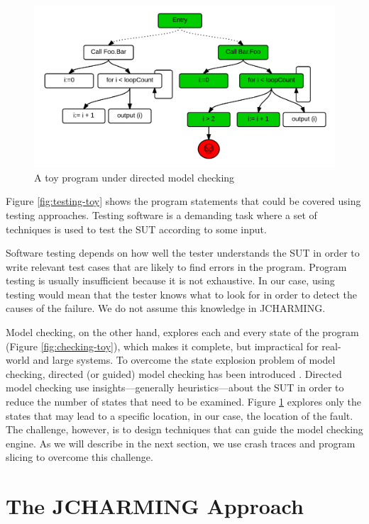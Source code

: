 \documentclass[times]{smrauth}
\begin{document}
\begin{figure}[h!]
  \centering
    \includegraphics{media/dmc.png}
    \caption{A toy program under directed model checking
    \label{fig:dchecking-toy}}
\end{figure}

Figure \ref{fig:testing-toy} shows the program statements that could be covered using testing approaches. Testing software is a demanding task where a set of techniques is used to test the SUT according to some input.

Software testing depends on how well the tester understands the SUT in order to write relevant test cases that are likely to find errors in the program. Program testing is usually insufficient because it is not exhaustive. In our case, using testing would mean that the tester knows what to look for in order to detect the causes of the failure. We do not assume this knowledge in JCHARMING. 

Model checking, on the other hand, explores each and every state of the program (Figure \ref{fig:checking-toy}), which makes it complete, but impractical for real-world and large systems. To overcome the state explosion problem of model checking, directed (or guided) model checking has been introduced \cite{Rungta2009}. Directed model checking use insights—generally heuristics—about the SUT in order to reduce the number of states that need to be examined. Figure \ref{fig:dchecking-toy} explores only the states that may lead to a specific location, in our case, the location of the fault. The challenge, however, is to design techniques that can guide the model checking engine. As we will describe in the next section, we use crash traces and program slicing to overcome this challenge.

\section{The JCHARMING Approach}
\end{document}
